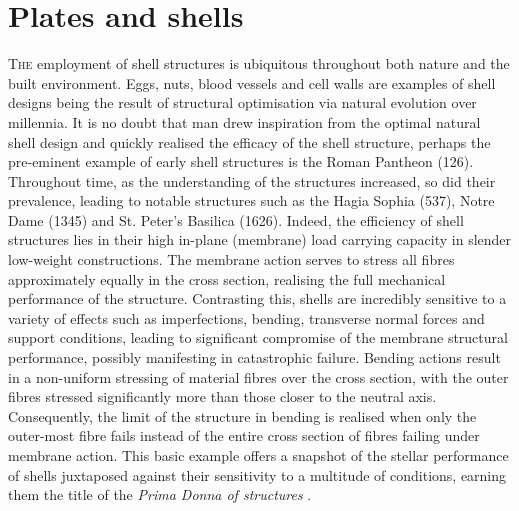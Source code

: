 


\chapter{Plates and shells}
\label{chap:chapter_2}

\renewcommand{\Thema}{Plates and shells}

\lettrine[lines=3]{T}{he} employment of shell structures is ubiquitous throughout both nature and the built environment. Eggs, nuts, blood vessels and cell walls are examples of shell designs being the result of structural optimisation via natural evolution over millennia. It is no doubt that man drew inspiration from the optimal natural shell design and quickly realised the efficacy of the shell structure, perhaps the pre-eminent example of early shell structures is the Roman Pantheon (126).  Throughout time, as the understanding of the structures increased, so did their prevalence, leading to notable structures such as the Hagia Sophia (537), Notre Dame (1345) and St. Peter's Basilica (1626). Indeed, the efficiency of shell structures lies in their high in-plane (membrane) load carrying capacity in slender low-weight constructions. The membrane action serves to stress all fibres approximately equally in the cross section, realising the full mechanical performance of the structure. Contrasting this, shells are incredibly sensitive to a variety of effects such as imperfections, bending, transverse normal forces and support conditions, leading to significant compromise of the membrane structural performance, possibly manifesting in catastrophic failure. Bending actions result in a non-uniform stressing of material fibres over the cross section, with the outer fibres stressed significantly more than those closer to the neutral axis. Consequently, the limit of the structure in bending is realised when only the outer-most fibre fails instead of the entire cross section of fibres failing under membrane action. This basic example offers a snapshot of the stellar performance of shells juxtaposed against their sensitivity to a multitude of conditions, earning them the title of the \textit{Prima Donna of structures} \cite{Ram16}.

